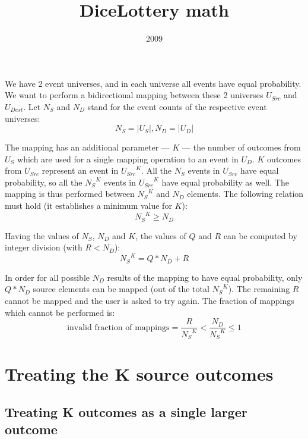 \documentclass[a4paper,12pt]{article}
\begin{document}
\title{DiceLottery math}
\date{2009}
\author{}
\maketitle

We have 2 event universes,
and in each universe all events have equal probability.
We want to perform a bidirectional mapping between these 2 universes
\(U_{Src}\) and \(U_{Dest}\).
Let \(N_S\) and \(N_D\) stand for
the event counts of the respective event universes:
\[N_S = |U_S|, N_D = |U_D|\]

The mapping has an additional parameter --- \(K\) ---
the number of outcomes from \(U_S\) which are used
for a single mapping operation to an event in \(U_D\).
\(K\) outcomes from \(U_{Src}\) represent an event in \({U_{Src}}^K\).
All the \(N_S\) events in \(U_{Src}\) have equal probability,
so all the \({N_S}^K\) events in \({U_{Src}}^K\)
have equal probability as well.
The mapping is thus performed between
\({N_S}^K\) and \(N_D\) elements.
The following relation must hold (it establishes a minimum value for \(K\)):
\begin{equation}
\label{eq:K}
{N_S}^K \geq N_D
\end{equation}

Having the values of \(N_S\), \(N_D\) and \(K\),
the values of \(Q\) and \(R\) can be computed by integer division
(with \(R < N_D\)):
\begin{equation}
\label{eq:QR}
{N_S}^K = Q * N_D + R
\end{equation}

In order for all possible \(N_D\) results of the mapping
to have equal probability,
only \(Q * N_D\) source elements can be mapped (out of the total \({N_S}^K\)).
The remaining \(R\) cannot be mapped and the user is asked to try again.
The fraction of mappings which cannot be performed is:
\begin{equation}
\label{eq:invalid-mappings}
\text{invalid fraction of mappings} =
\frac{R}{{N_S}^K} < \frac{N_D}{{N_S}^K} \leq 1
\end{equation}


\section{Treating the K source outcomes}

\subsection{Treating K outcomes as a single larger outcome}
\end{document}

